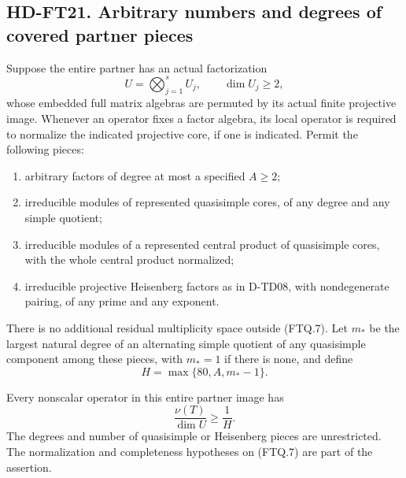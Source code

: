 \subsection*{HD-FT21. Arbitrary numbers and degrees of covered partner pieces}

Suppose the entire partner has an actual factorization
\[
 U=\bigotimes_{j=1}^s U_j,\qquad \dim U_j\ge2,
 \tag{FTQ.7}
\]
whose embedded full matrix algebras are permuted by its actual
finite projective image.  Whenever an operator fixes a factor
algebra, its local operator is required to normalize the indicated
projective core, if one is indicated.  Permit the following pieces:
\begin{enumerate}
\item arbitrary factors of degree at most a specified \(A\ge2\);
\item irreducible modules of represented quasisimple cores, of any
degree and any simple quotient;
\item irreducible modules of a represented central product of
quasisimple cores, with the whole central product normalized;
\item irreducible projective Heisenberg factors as in D-TD08,
with nondegenerate pairing, of any prime and any exponent.
\end{enumerate}
There is no additional residual multiplicity space outside (FTQ.7).
Let \(m_*\) be the largest natural degree of an alternating simple
quotient of any quasisimple component among these pieces, with
\(m_*=1\) if there is none, and define
\[
                         H=\max\{80,A,m_*-1\}.
 \tag{FTQ.8}
\]

\begin{theorem}[HD-FT21]
Every nonscalar operator in this entire partner image has
\[
                         \frac{\nu(T)}{\dim U}\ge\frac1H.
 \tag{FTQ.9}
\]
The degrees and number of quasisimple or Heisenberg pieces are
unrestricted.  The normalization and completeness hypotheses on
(FTQ.7) are part of the assertion.
\end{theorem}


